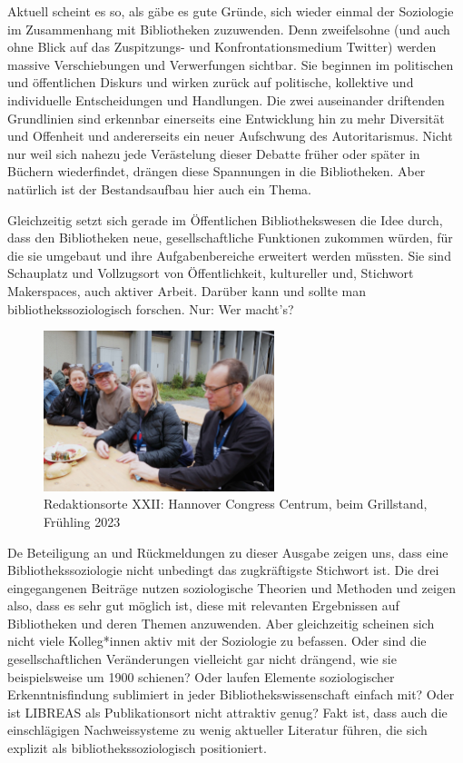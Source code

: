 \documentclass[a4paper,
fontsize=11pt,
oneside,
numbers=noperiodatend,
parskip=half-,
bibliography=totoc,
final
]{scrartcl}
\begin{document}
Aktuell scheint es so, als gäbe es gute Gründe, sich wieder einmal der
Soziologie im Zusammenhang mit Bibliotheken zuzuwenden. Denn
zweifelsohne (und auch ohne Blick auf das Zu\-spitzungs- und
Konfrontationsmedium Twitter) werden massive Verschiebungen und
Verwerfungen sichtbar. Sie beginnen im politischen und öffentlichen
Diskurs und wirken zurück auf politische, kollektive und individuelle
Entscheidungen und Handlungen. Die zwei auseinander driftenden
Grundlinien sind erkennbar einerseits eine Entwicklung hin zu mehr
Diversität und Offenheit und andererseits ein neuer Aufschwung des
Autoritarismus. Nicht nur weil sich nahezu jede Verästelung dieser
Debatte früher oder später in Büchern wiederfindet, drängen diese
Spannungen in die Bibliotheken. Aber natürlich ist der Bestandsaufbau
hier auch ein Thema.

Gleichzeitig setzt sich gerade im Öffentlichen Bibliothekswesen die Idee
durch, dass den Bibliotheken neue, gesellschaftliche Funktionen zukommen
würden, für die sie umgebaut und ihre Aufgabenbereiche erweitert werden
müssten. Sie sind Schauplatz und Vollzugsort von Öffentlichkeit,
kultureller und, Stichwort Makerspaces, auch aktiver Arbeit. Darüber
kann und sollte man bibliothekssoziologisch forschen. Nur: Wer macht's?

\begin{figure}
\centering
\includegraphics[width=0.6\textwidth]{editorial.jpg}
\caption{Redaktionsorte XXII: Hannover Congress
Centrum, beim Grillstand, Frühling 2023}
\end{figure}

De Beteiligung an und Rückmeldungen zu dieser Ausgabe zeigen uns, dass
eine Bibliothekssoziologie nicht unbedingt das zugkräftigste Stichwort
ist. Die drei eingegangenen Beiträge nutzen soziologische Theorien und
Methoden und zeigen also, dass es sehr gut möglich ist, diese mit
relevanten Ergebnissen auf Bibliotheken und deren Themen anzuwenden.
Aber gleichzeitig scheinen sich nicht viele Kolleg*innen aktiv mit der
Soziologie zu befassen. Oder sind die gesellschaftlichen Veränderungen
vielleicht gar nicht drängend, wie sie beispielsweise um 1900 schienen?
Oder laufen Elemente soziologischer Erkenntnisfindung sublimiert in
jeder Bibliothekswissenschaft einfach mit? Oder ist LIBREAS als
Publikationsort nicht attraktiv genug? Fakt ist, dass auch die
einschlägigen Nachweissysteme zu wenig aktueller Literatur führen, die
sich explizit als bibliothekssoziologisch positioniert.
\end{document}
